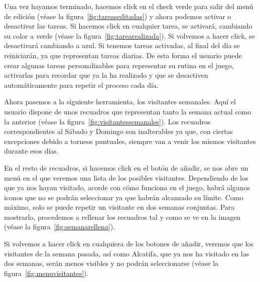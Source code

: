 Una vez hayamos terminado, hacemos click en el check verde para salir del menú de edición {(v\'ease la figura~\ref{fig:tareaseditadas})} y ahora podemos activar o desactivar las tareas. Si hacemos click en cualquier tarea, se activará, cambiando su color a verde {(v\'ease la figura~\ref{fig:tarearealizada})}. Si volvemos a hacer click, se desactivará cambiando a azul. Si tenemos tareas activadas, al final del día se reiniciarán, ya que representan tareas diarias. De esta forma el usuario puede crear algunas tareas personalizables para representar su rutina en el juego, activarlas para recordar que ya la ha realizado y que se desactiven automáticamente para repetir el proceso cada día.\\


\clearpage

Ahora pasemos a la siguiente herramienta, los visitantes semanales. Aquí el usuario dispone de unos recuadros que representan tanto la semana actual como la anterior {(v\'ease la figura~\ref{fig:visitantessemanales})}. Los recuadros correspondientes al Sábado y Domingo son inalterables ya que, con ciertas excepciones debido a torneos puntuales, siempre van a venir los mismos visitantes durante esos días.\\


En el resto de recuadros, si hacemos click en el botón de añadir, se nos abre un menú en el que veremos una lista de los posibles visitantes. Dependiendo de los que ya nos hayan visitado, acorde con cómo funciona en el juego, habrá algunos iconos que no se podrán seleccionar ya que habrán alcanzado su límite. Como máximo, solo se puede repetir un visitante en dos semanas conjuntas. Para mostrarlo, procedemos a rellenar los recuadros tal y como se ve en la imagen {(v\'ease la figura~\ref{fig:semanarellena})}.\\


\clearpage

Si volvemos a hacer click en cualquiera de los botones de añadir, veremos que los visitantes de la semana pasada, así como Alcatifa, que ya nos ha visitado en las dos semanas, serán menos visibles y no podrán seleccionarse {(v\'ease la figura~\ref{fig:menuvisitantes})}.\\

